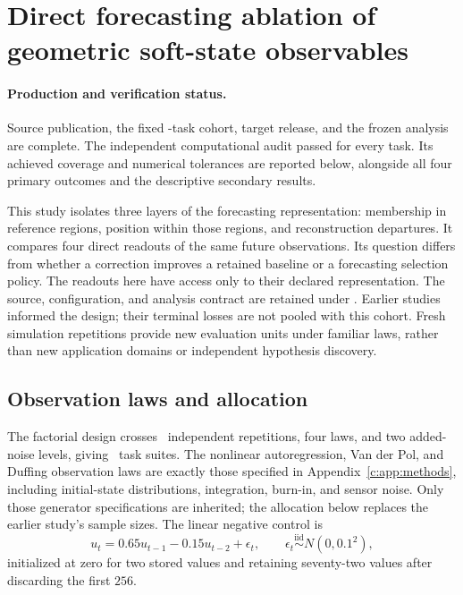 \section{Direct forecasting ablation of geometric soft-state observables}
\label{sec:soft-state-ablation-supp}

\paragraph{Production and verification status.}
Source publication, the fixed \SATasks-task cohort, target release, and
the frozen analysis are complete. The independent computational audit
passed for every task. Its achieved coverage and numerical tolerances
are reported below, alongside all four primary outcomes and the
descriptive secondary results.

This study isolates three layers of the forecasting representation:
membership in reference regions, position within those regions, and
reconstruction departures. It compares four direct readouts of the same
future observations. Its question differs from whether a correction
improves a retained baseline or a forecasting selection policy. The
readouts here have access only to their declared representation.
The source, configuration, and analysis contract are retained under
.
Earlier studies informed the design; their terminal losses are not pooled
with this cohort. Fresh simulation repetitions provide new evaluation
units under familiar laws, rather than new application domains or
independent hypothesis discovery.

\subsection{Observation laws and allocation}

The factorial design crosses \SARepetitions\ independent repetitions,
four laws, and two added-noise levels, giving \SATasks\ task suites.
The nonlinear autoregression, Van der Pol, and Duffing observation laws
are exactly those specified in Appendix~\ref{c:app:methods}, including
initial-state distributions, integration, burn-in, and sensor noise.
Only those generator specifications are inherited; the allocation below
replaces the earlier study's sample sizes. The linear negative control is
\[
 u_t=0.65u_{t-1}-0.15u_{t-2}+\epsilon_t,
 \qquad \epsilon_t\stackrel{\mathrm{iid}}\sim N(0,0.1^2),
\]
initialized at zero for two stored values and retaining seventy-two
values after discarding the first $256$.

